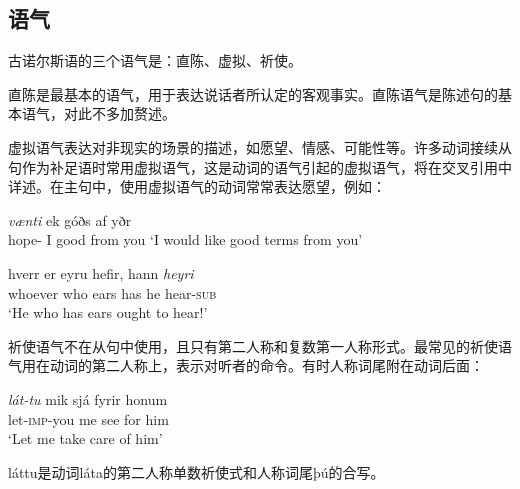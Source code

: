 \subsection{语气}
古诺尔斯语的三个语气是：直陈、虚拟、祈使。

直陈是最基本的语气，用于表达说话者所认定的客观事实。直陈语气是陈述句的基本语气，对此不多加赘述。

虚拟语气表达对非现实的场景的描述，如愿望、情感、可能性等。许多动词接续从句作为补足语时常用虚拟语气，这是动词的语气引起的虚拟语气，将在交叉引用中详述。在主句中，使用虚拟语气的动词常常表达愿望，例如：
\begin{exe}
    \ex
    \gll \textit{vænti} ek góðs af yðr\\
    hope-{\sub} I good from you
    \trans `I would like good terms from you'

    \ex
    \gll hverr	er	eyru	hefir,	hann	\textit{heyri}\\
whoever	who	ears	has	he	hear-\textsc{sub}\\
\trans `He who has ears ought to hear!’

\end{exe}

祈使语气不在从句中使用，且只有第二人称和复数第一人称形式。最常见的祈使语气用在动词的第二人称上，表示对听者的命令。有时人称词尾附在动词后面：
\begin{exe}
\ex
    \gll \textit{lát-tu}	mik	sjá	fyrir	honum\\
let-\textsc{imp}-you	me	see	for	him\\
\trans `Let me take care of him’
\end{exe}

láttu是动词láta的第二人称单数祈使式和人称词尾þú的合写。
